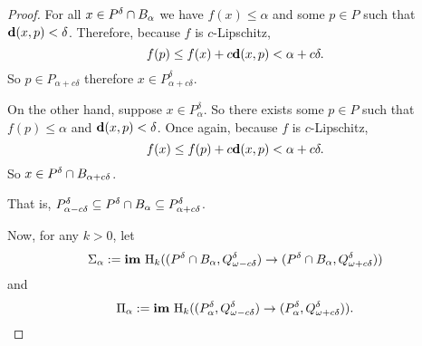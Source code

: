 \begin{proof}
  For all $x\in \P\cap B_\alpha$ we have $f(x)\leq \alpha$ and some $p\in P$ such that $\dist(x, p) < \of$.
  Therefore, because $f$ is $c$-Lipschitz,
  \[ f(p)\leq f(x) + c\dist(x, p) < \alpha + c\delta.\]
  So $p\in P_{\alpha + c\delta}$ therefore $x\in P_{\alpha+c\delta}^\delta$.

  On the other hand, suppose $x\in P_\alpha^\delta$.
  So there exists some $p\in P$ such that $f(p)\leq \alpha$ and $\dist(x, p) < \delta$.
  Once again, because $f$ is $c$-Lipschitz,
  \[ f(x)\leq f(p)+c\dist(x, p) < \alpha + c\of. \]
  So $x\in \P\cap B_{\alpha+c\delta}$.

  That is, $P_{\alpha-c\delta}^\delta\subseteq \P\cap B_\alpha\subseteq P_{\alpha + c\delta}^\delta$.

  Now, for any $k > 0$, let
  \[\Sigma_\alpha := \im~\hom_k((\P\cap B_\alpha, \Q^\of)\to (\P\cap B_\alpha, \QQ^\of))\]
  and
  \[\Pi_\alpha := \im~\hom_k((P_\alpha^\of, \Q^\of)\to (P_\alpha^\of, \QQ^\of)).\]


\end{proof}
